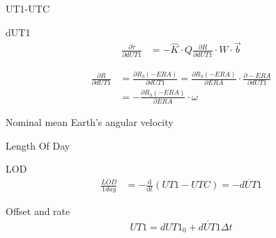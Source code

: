 \documentclass[14pt,table,t, c]{beamer}
\begin{document}
\begin{frame}{UT1-UTC}
\begin{block}{dUT1}
\vspace*{-\baselineskip}\setlength\belowdisplayskip{0pt}\setlength\abovedisplayskip{0pt}
\begin{align*}
\frac{\partial \tau}{\partial dUT1} &= - \hat{K} \cdot Q \frac{\partial R}{\partial dUT1} \cdot W
\cdot \vec{b}
\end{align*}
\end{block}
\begin{block}{\vspace*{-3ex}}
\vspace*{-\baselineskip}\setlength\belowdisplayskip{0pt}\setlength\abovedisplayskip{5pt}
\begin{align*}
\frac{\partial R}{\partial dUT1} &= \frac{\partial R_3(-ERA)}{\partial dUT1}
= \frac{\partial R_3(-ERA)}{\partial ERA}\cdot \frac{\partial -ERA}{\partial dUT1} \\
&= -\frac{\partial R_3(-ERA)}{\partial ERA}\cdot \omega
\end{align*}
\end{block}
\begin{description}[$\omega$]
\item[$\omega$] Nominal mean Earth's angular velocity
\end{description}
\end{frame}

\begin{frame}{Length Of Day}
\begin{block}{LOD}
\vspace*{-\baselineskip}\setlength\belowdisplayskip{0pt}\setlength\abovedisplayskip{0pt}
\begin{align*}
\frac{LOD}{1 day} &= - \frac{\mathrm{d}}{\mathrm{d}t} (UT1 - UTC) = - \dot{dUT1}
\end{align*}
\end{block}
\begin{block}{Offset and rate}
\vspace*{-\baselineskip}\setlength\belowdisplayskip{0pt}\setlength\abovedisplayskip{5pt}
\begin{align*}
UT1 = {dUT1_0} + \dot{dUT1}\Delta t
\end{align*}
\end{block}
\end{frame}
\end{document}
